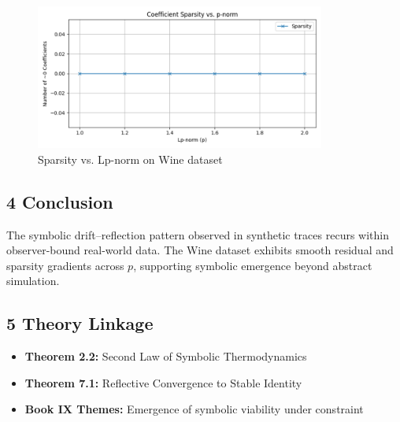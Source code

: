 \begin{figure}[H]
\centering
\includegraphics[width=0.85\textwidth]{srv_traces/6_sparsity_vs_p.png}
\caption{Sparsity vs. Lp-norm on Wine dataset}
\label{figure:trace6_sparsity_wine}
\end{figure}

\subsection*{4 Conclusion}
\label{subsection:trace6_conclusion}

The symbolic drift–reflection pattern observed in synthetic traces recurs within observer-bound real-world data. The Wine dataset exhibits smooth residual and sparsity gradients across $p$, supporting symbolic emergence beyond abstract simulation.

\subsection*{5 Theory Linkage}
\label{subsection:trace6_theory_linkage}

\begin{itemize}
    \item \textbf{Theorem 2.2:} Second Law of Symbolic Thermodynamics
    \item \textbf{Theorem 7.1:} Reflective Convergence to Stable Identity
    \item \textbf{Book IX Themes:} Emergence of symbolic viability under constraint
\end{itemize}
